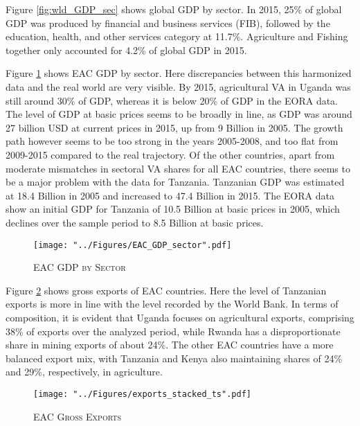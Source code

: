 \documentclass[a4paper]{article}
\begin{document}
Figure \ref{fig:wld_GDP_sec} shows global GDP by sector. In 2015, 25\% of global GDP was produced by financial and business services (FIB), followed by the education, health, and other services category at 11.7\%. Agriculture and Fishing together only accounted for 4.2\% of global GDP in 2015. \newline

Figure \ref{fig:EAC_GDP_sec} shows EAC GDP by sector. Here discrepancies between this harmonized data and the real world are very visible. By 2015, agricultural VA in Uganda was still around 30\% of GDP, whereas it is below 20\% of GDP in the EORA data. The level of GDP at basic prices seems to be broadly in line, as GDP was around 27 billion USD at current prices in 2015, up from 9 Billion in 2005. The growth path however seems to be too strong in the years 2005-2008, and too flat from 2009-2015 compared to the real trajectory. Of the other countries, apart from moderate mismatches in sectoral VA shares for all EAC countries, there seems to be a major problem with the data for Tanzania. Tanzanian GDP was estimated at 18.4 Billion in 2005 and increased to 47.4 Billion in 2015. The EORA data show an initial GDP for Tanzania of 10.5 Billion at basic prices in 2005, which declines over the sample period to 8.5 Billion at basic prices. \newline

\begin{figure}[h!]
\centering
\caption{\label{fig:EAC_GDP_sec}\textsc{EAC GDP by Sector}}
\texttt{[image: "../Figures/EAC\_GDP\_sector".pdf]} %
\end{figure}
\FloatBarrier

Figure \ref{fig:exp} shows gross exports of EAC countries. Here the level of Tanzanian exports is more in line with the level recorded by the World Bank. In terms of composition, it is evident that Uganda focuses on agricultural exports, comprising 38\% of exports over the analyzed period, while Rwanda has a disproportionate share in mining exports of about 24\%. The other EAC countries have a more balanced export mix, with Tanzania and Kenya also maintaining shares of 24\% and 29\%, respectively, in agriculture. 

\begin{figure}[h!]
\centering
\caption{\label{fig:exp}\textsc{EAC Gross Exports}}
\texttt{[image: "../Figures/exports\_stacked\_ts".pdf]} %
\end{figure}
\FloatBarrier
\end{document}
